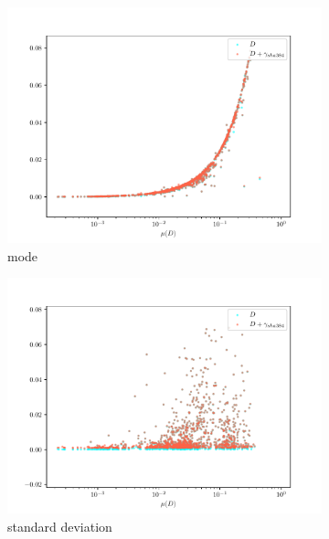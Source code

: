 \documentclass[12pt,a4paper,automark, toc=bib]{scrreprt}
\theoremstyle{definition}
\begin{document}
\begin{figure}
\begin{subfigure}{0.32\linewidth}
				\includegraphics[width=\linewidth]{figures/stat_sha384_0mode.pdf}
				\caption{mode}
			\end{subfigure}
			\begin{subfigure}{0.32\linewidth}
				\includegraphics[width=\linewidth]{figures/stat_sha384_0std.pdf}
				\caption{standard deviation}
			\end{subfigure}
			\begin{subfigure}{0.32\linewidth}

\end{subfigure}
\end{figure}
\end{document}
